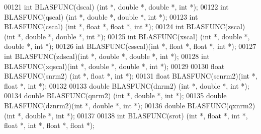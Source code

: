 \begin{DoxyCode}
00121 \textcolor{keywordtype}{int}    BLASFUNC(dscal) (\textcolor{keywordtype}{int} *,  \textcolor{keywordtype}{double} *, \textcolor{keywordtype}{double} *, \textcolor{keywordtype}{int} *);
00122 \textcolor{keywordtype}{int}    BLASFUNC(qscal) (\textcolor{keywordtype}{int} *,  \textcolor{keywordtype}{double} *, \textcolor{keywordtype}{double} *, \textcolor{keywordtype}{int} *);
00123 \textcolor{keywordtype}{int}    BLASFUNC(cscal) (\textcolor{keywordtype}{int} *,  \textcolor{keywordtype}{float}  *, \textcolor{keywordtype}{float}  *, \textcolor{keywordtype}{int} *);
00124 \textcolor{keywordtype}{int}    BLASFUNC(zscal) (\textcolor{keywordtype}{int} *,  \textcolor{keywordtype}{double} *, \textcolor{keywordtype}{double} *, \textcolor{keywordtype}{int} *);
00125 \textcolor{keywordtype}{int}    BLASFUNC(xscal) (\textcolor{keywordtype}{int} *,  \textcolor{keywordtype}{double} *, \textcolor{keywordtype}{double} *, \textcolor{keywordtype}{int} *);
00126 \textcolor{keywordtype}{int}    BLASFUNC(csscal)(\textcolor{keywordtype}{int} *,  \textcolor{keywordtype}{float}  *, \textcolor{keywordtype}{float}  *, \textcolor{keywordtype}{int} *);
00127 \textcolor{keywordtype}{int}    BLASFUNC(zdscal)(\textcolor{keywordtype}{int} *,  \textcolor{keywordtype}{double} *, \textcolor{keywordtype}{double} *, \textcolor{keywordtype}{int} *);
00128 \textcolor{keywordtype}{int}    BLASFUNC(xqscal)(\textcolor{keywordtype}{int} *,  \textcolor{keywordtype}{double} *, \textcolor{keywordtype}{double} *, \textcolor{keywordtype}{int} *);
00129 
00130 \textcolor{keywordtype}{float}  BLASFUNC(snrm2) (\textcolor{keywordtype}{int} *, \textcolor{keywordtype}{float}  *, \textcolor{keywordtype}{int} *);
00131 \textcolor{keywordtype}{float}  BLASFUNC(scnrm2)(\textcolor{keywordtype}{int} *, \textcolor{keywordtype}{float}  *, \textcolor{keywordtype}{int} *);
00132 
00133 \textcolor{keywordtype}{double} BLASFUNC(dnrm2) (\textcolor{keywordtype}{int} *, \textcolor{keywordtype}{double} *, \textcolor{keywordtype}{int} *);
00134 \textcolor{keywordtype}{double} BLASFUNC(qnrm2) (\textcolor{keywordtype}{int} *, \textcolor{keywordtype}{double} *, \textcolor{keywordtype}{int} *);
00135 \textcolor{keywordtype}{double} BLASFUNC(dznrm2)(\textcolor{keywordtype}{int} *, \textcolor{keywordtype}{double} *, \textcolor{keywordtype}{int} *);
00136 \textcolor{keywordtype}{double} BLASFUNC(qxnrm2)(\textcolor{keywordtype}{int} *, \textcolor{keywordtype}{double} *, \textcolor{keywordtype}{int} *);
00137 
00138 \textcolor{keywordtype}{int}    BLASFUNC(srot)  (\textcolor{keywordtype}{int} *, \textcolor{keywordtype}{float}  *, \textcolor{keywordtype}{int} *, \textcolor{keywordtype}{float}  *, \textcolor{keywordtype}{int} *, \textcolor{keywordtype}{float}  *, \textcolor{keywordtype}{float}  *);

\end{DoxyCode}
